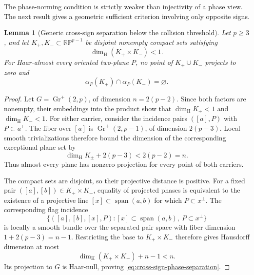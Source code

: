 \documentclass[11pt]{article}
\numberwithin{equation}{section}
\theoremstyle{thmstyleone}%
\newtheorem{lemma}[lemma]{Lemma}
\theoremstyle{thmstyletwo}%
\let\cref\autoref
\begin{document}
The phase-norming condition is strictly weaker than injectivity of a phase
view.  The next result gives a geometric sufficient criterion involving only
opposite signs.

\begin{lemma}[Generic cross-sign separation below the collision threshold]
\label{lem:generic-cross-sign-separation}
Let \(p\geq3\), and let \(K_+,K_-\subset\mathbb{RP}^{p-1}\) be disjoint
nonempty compact sets satisfying
\begin{equation}
  \dim_{\mathrm H}(K_+\times K_-)<1.
  \label{eq:cross-product-dimension-threshold}
\end{equation}
For Haar-almost every oriented two-plane \(P\), no point of
\(K_+\cup K_-\) projects to zero and
\begin{equation}
  \alpha_P(K_+)\cap\alpha_P(K_-)=\varnothing.
  \label{eq:cross-sign-phase-separation}
\end{equation}
\end{lemma}

\begin{proof}
Let \(G=\operatorname{Gr}^+(2,p)\), of dimension \(n=2(p-2)\).  Since
both factors are nonempty, their embeddings into the product show that
\(\dim_{\mathrm H}K_+<1\) and \(\dim_{\mathrm H}K_-<1\).  For either
carrier, consider the incidence pairs \(([a],P)\) with \(P\subset a^\perp\).
The fiber over \([a]\) is \(\operatorname{Gr}^+(2,p-1)\), of dimension
\(2(p-3)\).  Local smooth trivializations therefore bound the dimension of
the corresponding exceptional plane set by
\[
  \dim_{\mathrm H}K_\pm+2(p-3)<2(p-2)=n.
\]
Thus almost every plane has nonzero projection for every point of both
carriers.

The compact sets are disjoint, so their projective distance is positive.
For a fixed pair \(([a],[b])\in K_+\times K_-\), equality of projected
phases is equivalent to the existence of a projective line
\([x]\subset\operatorname{span}(a,b)\) for which \(P\subset x^\perp\).
The corresponding flag incidence
\[
  \{([a],[b],[x],P):[x]\subset\operatorname{span}(a,b),
       \ P\subset x^\perp\}
\]
is locally a smooth bundle over the separated pair space with fiber
dimension
\(1+2(p-3)=n-1\).  Restricting the base to \(K_+\times K_-\) therefore
gives Hausdorff dimension at most
\[
  \dim_{\mathrm H}(K_+\times K_-)+n-1<n.
\]
Its projection to \(G\) is Haar-null, proving
\cref{eq:cross-sign-phase-separation}.
\end{proof}
\end{document}
